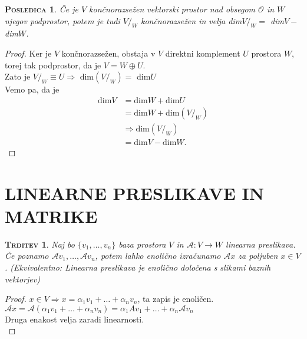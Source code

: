 \documentclass[a4paper,12pt]{article}
\newcommand{\A}{\mathcal{A}}
\newtheorem*{trditev}{\textsc{Trditev}}
\newtheorem*{posledica}{\textsc{Posledica}}
\begin{document}
\begin{posledica}
	Če je $V$ končnorazsežen vektorski prostor nad obsegom $\mathcal{O}$ in $W$ njegov \linebreak  podprostor, potem je tudi $V/_W$ končnorazsežen in velja dim$V/_W=$ dim$V-$ dim$W$. \\
\end{posledica}

\begin{proof}
	Ker je $V$ končnorazsežen, obstaja v $V$ direktni komplement $U$ prostora $W$, torej tak podprostor, da je $V=W\oplus U$. \\

	Zato je $V/_W\equiv U\Rightarrow$ dim$(V/_W)=$ dim$U$ \\

	Vemo pa, da je \begin{align*}
	\text{dim}V &= \text{dim}W+\text{dim}U \\
	& = \text{dim}W+ \text{dim}(V/_W) \\
	& \Rightarrow \text{dim}(V/_W) \\
	&= \text{dim}V- \text{dim}W.
	\end{align*}
\end{proof}

\newpage

\section{LINEARNE PRESLIKAVE IN MATRIKE}

\begin{trditev}
	Naj bo $\{v_1,\ldots,v_n\}$ baza prostora $V$ in $\A :V\to W$ linearna preslikava. Če poznamo $\A v_1,\ldots,\A v_n$, potem lahko enolično izračunamo $\A x$ za poljuben $x\in V$. \linebreak (Ekvivalentno: Linearna preslikava je enolično določena s slikami baznih vektorjev)\\
\end{trditev}

\begin{proof}
	$x\in V \Rightarrow x=\alpha_1 v_1+\ldots+\alpha_n v_n$, ta zapis je enoličen.\\

	$\A x=\A (\alpha_1 v_1+\ldots+\alpha_n v_n)=\alpha_1 Av_1+\ldots+\alpha_n \A v_n$ \\

	Druga enakost velja zaradi linearnosti.\\
\end{proof}
\end{document}
